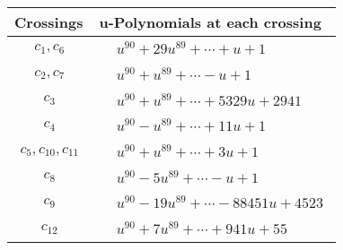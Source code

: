 \documentclass[1p]{elsarticle_modified}
\theoremstyle{definition}
\begin{document}
\begin{tabular}{m{50pt}|m{274pt}}
Crossings & \hspace{64pt}u-Polynomials at each crossing \\
\hline $$\begin{aligned}c_{1},c_{6}\end{aligned}$$&$\begin{aligned}
&u^{90}+29 u^{89}+\cdots+u+1
\end{aligned}$\\
\hline $$\begin{aligned}c_{2},c_{7}\end{aligned}$$&$\begin{aligned}
&u^{90}+u^{89}+\cdots- u+1
\end{aligned}$\\
\hline $$\begin{aligned}c_{3}\end{aligned}$$&$\begin{aligned}
&u^{90}+u^{89}+\cdots+5329 u+2941
\end{aligned}$\\
\hline $$\begin{aligned}c_{4}\end{aligned}$$&$\begin{aligned}
&u^{90}- u^{89}+\cdots+11 u+1
\end{aligned}$\\
\hline $$\begin{aligned}c_{5},c_{10},c_{11}\end{aligned}$$&$\begin{aligned}
&u^{90}+u^{89}+\cdots+3 u+1
\end{aligned}$\\
\hline $$\begin{aligned}c_{8}\end{aligned}$$&$\begin{aligned}
&u^{90}-5 u^{89}+\cdots- u+1
\end{aligned}$\\
\hline $$\begin{aligned}c_{9}\end{aligned}$$&$\begin{aligned}
&u^{90}-19 u^{89}+\cdots-88451 u+4523
\end{aligned}$\\
\hline $$\begin{aligned}c_{12}\end{aligned}$$&$\begin{aligned}
&u^{90}+7 u^{89}+\cdots+941 u+55
\end{aligned}$\\
\hline
\end{tabular}\newpage\renewcommand{\arraystretch}{1}
\end{document}
